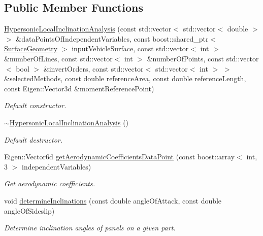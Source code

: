 \subsection*{Public Member Functions}
\begin{DoxyCompactItemize}
\item 
\hyperlink{classtudat_1_1aerodynamics_1_1HypersonicLocalInclinationAnalysis_adce8ada2453063490dba0c93dff237b1}{Hypersonic\+Local\+Inclination\+Analysis} (const std\+::vector$<$ std\+::vector$<$ double $>$ $>$ \&data\+Points\+Of\+Independent\+Variables, const boost\+::shared\+\_\+ptr$<$ \hyperlink{classtudat_1_1SurfaceGeometry}{Surface\+Geometry} $>$ input\+Vehicle\+Surface, const std\+::vector$<$ int $>$ \&number\+Of\+Lines, const std\+::vector$<$ int $>$ \&number\+Of\+Points, const std\+::vector$<$ bool $>$ \&invert\+Orders, const std\+::vector$<$ std\+::vector$<$ int $>$ $>$ \&selected\+Methods, const double reference\+Area, const double reference\+Length, const Eigen\+::\+Vector3d \&moment\+Reference\+Point)
\begin{DoxyCompactList}\small\item\em Default constructor. \end{DoxyCompactList}\item 
\hyperlink{classtudat_1_1aerodynamics_1_1HypersonicLocalInclinationAnalysis_ab2103af7d1c4307ba63c355890161b39}{$\sim$\+Hypersonic\+Local\+Inclination\+Analysis} ()
\begin{DoxyCompactList}\small\item\em Default destructor. \end{DoxyCompactList}\item 
Eigen\+::\+Vector6d \hyperlink{classtudat_1_1aerodynamics_1_1HypersonicLocalInclinationAnalysis_afa3ab626ce49d0ac1311d68a13f55693}{get\+Aerodynamic\+Coefficients\+Data\+Point} (const boost\+::array$<$ int, 3 $>$ independent\+Variables)
\begin{DoxyCompactList}\small\item\em Get aerodynamic coefficients. \end{DoxyCompactList}\item 
void \hyperlink{classtudat_1_1aerodynamics_1_1HypersonicLocalInclinationAnalysis_afd7c40ebd7440f831f83ee2784408fad}{determine\+Inclinations} (const double angle\+Of\+Attack, const double angle\+Of\+Sideslip)
\begin{DoxyCompactList}\small\item\em Determine inclination angles of panels on a given part. \end{DoxyCompactList}\item 

\end{DoxyCompactItemize}
